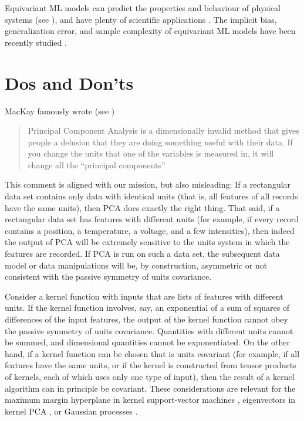 \documentclass{article} %
\begin{document}
Equivariant ML models can predict the properties and behaviour of physical systems (see \citealt{cheng2019covariance}), and have plenty of scientific applications \citep{batzner20223, musaelian2022learning, stark2022equibind, yu-physics, wang2022approximately}. The implicit bias, generalization error, and sample complexity of equivariant ML models have been recently studied \citep{petrache2023approximation,lawrence2021implicit, bietti2021sample, elesedy2021provably, elesedy2021kernel, mei2021learning}.

\section{Dos and Don'ts}\label{sec:dos}
MacKay famously wrote (see \citealt{muldoonmedium})
\begin{quote}Principal Component Analysis is a dimensionally invalid method that gives people a delusion that they are doing something useful with their data. If you change the units that one of the variables is measured in, it will change all the ``principal components''\end{quote}
This comment is aligned with our mission, but also misleading: If a rectangular data set contains only data with identical units (that is, all features of all records have the same units), then PCA does exactly the right thing.
That said, if a rectangular data set has features with different units (for example, if every record contains a position, a temperature, a voltage, and a few intensities), then indeed the output of PCA will be extremely sensitive to the units system in which the features are recorded.
If PCA is run on such a data set, the subsequent data model or data manipulations will be, by construction, asymmetric or not consistent with the passive symmetry of units covariance.

Consider a kernel function with inputs that are lists of features with different units.
If the kernel function involves, say, an exponential of a sum of squares of differences of the input features, the output of the kernel function cannot obey the passive symmetry of units covariance.
Quantities with different units cannot be summed, and dimensional quantities cannot be exponentiated. 
On the other hand, if a kernel function can be chosen that is units covariant (for example, if all features have the same units, or if the kernel is constructed from tensor products of kernels, each of which uses only one type of input), then the result of a kernel algorithm can in principle be covariant.
These considerations are relevant for the maximum margin hyperplane in kernel support-vector machines \citep{ksvm}, eigenvectors in kernel PCA \citep{SchSmo02}, or Gaussian processes \citep{gpml}.
\end{document}
